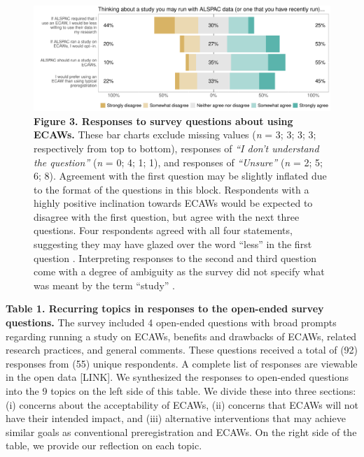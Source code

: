\documentclass[
  man,floatsintext]{apa6}
\begin{document}
\begin{figure}

{\centering \includegraphics[width=1\linewidth]{figs/alspacPlot-1} 

}

\caption{\textbf{Figure 3. Responses to survey questions about using ECAWs.} These bar charts exclude missing values (\emph{n} = 3; 3; 3; 3; respectively from top to bottom), responses of \emph{``I don't understand the question''} (\emph{n} = 0; 4; 1; 1), and responses of \emph{``Unsure''} (\emph{n} = 2; 5; 6; 8). Agreement with the first question may be slightly inflated due to the format of the questions in this block. Respondents with a highly positive inclination towards ECAWs would be expected to disagree with the first question, but agree with the next three questions. Four respondents agreed with all four statements, suggesting they may have glazed over the word ``less'' in the first question \protect\footnotemark[3]. Interpreting responses to the second and third question come with a degree of ambiguity as the survey did not specify what was meant by the term ``study'' \protect\footnotemark[4].}\label{fig:alspacPlot}
\end{figure}



\protect{}
\protect{}

\textbf{Table 1. Recurring topics in responses to the open-ended survey questions.} The survey included 4 open-ended questions with broad prompts regarding running a study on ECAWs, benefits and drawbacks of ECAWs, related research practices, and general comments. These questions received a total of (92) responses from (55) unique respondents. A complete list of responses are viewable in the open data {[}LINK{]}. We synthesized the responses to open-ended questions into the 9 topics on the left side of this table. We divide these into three sections: (i) concerns about the acceptability of ECAWs, (ii) concerns that ECAWs will not have their intended impact, and (iii) alternative interventions that may achieve similar goals as conventional preregistration and ECAWs. On the right side of the table, we provide our reflection on each topic.
\end{document}
